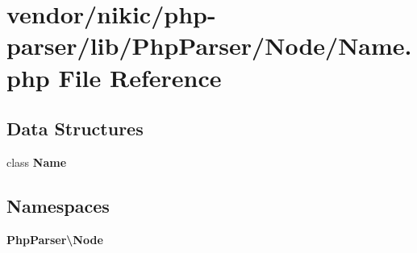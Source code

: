 \section{vendor/nikic/php-\/parser/lib/\+Php\+Parser/\+Node/\+Name.php File Reference}
\label{_name_8php}
\subsection*{Data Structures}
\begin{DoxyCompactItemize}
\item 
class {\bf Name}
\end{DoxyCompactItemize}
\subsection*{Namespaces}
\begin{DoxyCompactItemize}
\item 
 {\bf Php\+Parser\textbackslash{}\+Node}
\end{DoxyCompactItemize}
